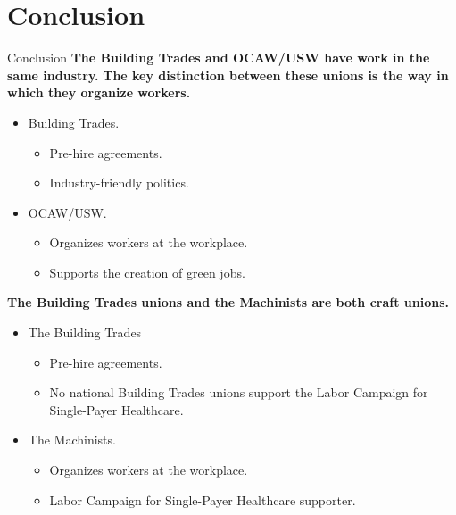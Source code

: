 \documentclass{beamer}
\begin{document}
\section{Conclusion}
\begin{frame}{Conclusion}
\textbf{The Building Trades and OCAW/USW have work in the same industry.}\newline\newline
\textbf{The key distinction between these unions is the way in which they organize workers.}
\begin{itemize}
	\item Building Trades.
	\begin{itemize}
		\item Pre-hire agreements.
		\item Industry-friendly politics.
  	\end{itemize}
  	\item OCAW/USW.
  	\begin{itemize}
  		\item Organizes workers at the workplace.
  		\item Supports the creation of green jobs.
  	\end{itemize}
\end{itemize}
  		
\textbf{The Building Trades unions and the Machinists are both craft unions.}
\begin{itemize}
	\item The Building Trades
	\begin{itemize}
		\item Pre-hire agreements.
		\item No national Building Trades unions support the Labor Campaign for Single-Payer Healthcare.
	\end{itemize}
  	\item The Machinists.
  	\begin{itemize}
  		\item Organizes workers at the workplace.
  		\item Labor Campaign for Single-Payer Healthcare supporter.
  	\end{itemize}
\end{itemize}
\end{frame}
\end{document}
